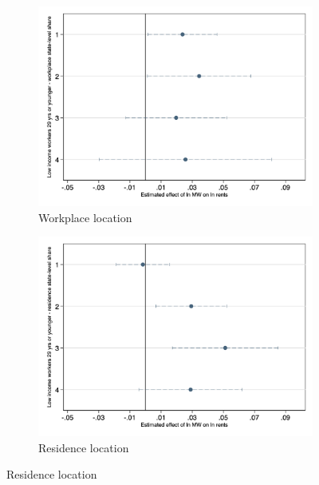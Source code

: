 \begin{figure}[h!]
    \caption{Static DiD model: MW impact by workers job and residence location}
    \label{fig:static_dd_workers_home_work}
    \centering
    \begin{subfigure}[b]{0.6\textwidth}
        \caption{Workplace location}                  %
        \includegraphics[width = \textwidth]{../input/fd_static_heter_walall_29y_lowinc_ssh.png}
    \end{subfigure}
    \begin{subfigure}[b]{0.6\textwidth}
        \caption{Residence location}
        \includegraphics[width = \textwidth]{../input/fd_static_heter_halall_29y_lowinc_ssh.png}
    \end{subfigure}
    \begin{minipage}{0.95\textwidth} \footnotesize

\end{minipage}
\end{figure}
